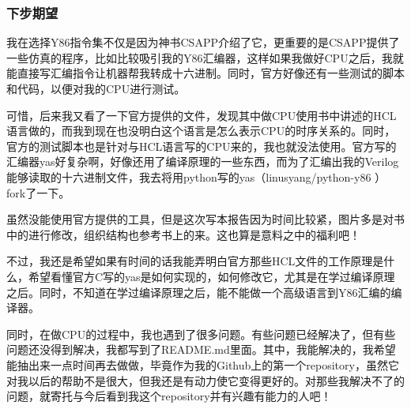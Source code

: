 \subsubsection{下步期望}\label{ux4e0bux6b65ux671fux671b}

我在选择Y86指令集不仅是因为神书CSAPP介绍了它，更重要的是CSAPP提供了一些仿真的程序，比如比较吸引我的Y86汇编器，这样如果我做好CPU之后，我就能直接写汇编指令让机器帮我转成十六进制。同时，官方好像还有一些测试的脚本和代码，以便对我的CPU进行测试。

可惜，后来我又看了一下官方提供的文件，发现其中做CPU使用书中讲述的HCL语言做的，而我到现在也没明白这个语言是怎么表示CPU的时序关系的。同时，官方的测试脚本也是针对与HCL语言写的CPU来的，我也就没法使用。官方写的汇编器yas好复杂啊，好像还用了编译原理的一些东西，而为了汇编出我的Verilog能够读取的十六进制文件，我去将用python写的yas（linusyang/python-y86
）fork了一下。

虽然没能使用官方提供的工具，但是这次写本报告因为时间比较紧，图片多是对书中的进行修改，组织结构也参考书上的来。这也算是意料之中的福利吧！

不过，我还是希望如果有时间的话我能弄明白官方那些HCL文件的工作原理是什么，希望看懂官方C写的yas是如何实现的，如何修改它，尤其是在学过编译原理之后。同时，不知道在学过编译原理之后，能不能做一个高级语言到Y86汇编的编译器。

同时，在做CPU的过程中，我也遇到了很多问题。有些问题已经解决了，但有些问题还没得到解决，我都写到了README.md里面。其中，我能解决的，我希望能抽出来一点时间再去做做，毕竟作为我的Github上的第一个repository，虽然它对我以后的帮助不是很大，但我还是有动力使它变得更好的。对那些我解决不了的问题，就寄托与今后看到我这个repository并有兴趣有能力的人吧！
